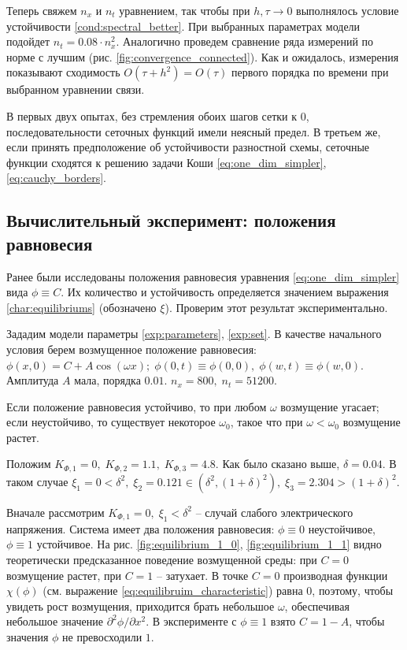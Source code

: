 Теперь свяжем $n_x$ и $n_t$ уравнением, так чтобы при $h, \tau \to 0$ выполнялось условие устойчивости \eqref{cond:spectral_better}. При выбранных параметрах модели подойдет $n_t = 0.08 \cdot n_x^2$. Аналогично проведем сравнение ряда измерений по норме с лучшим (рис. \ref{fig:convergence_connected}). Как и ожидалось, измерения показывают сходимость $O(\tau + h^2) = O(\tau)$ первого порядка по времени при выбранном уравнении связи.

В первых двух опытах, без стремления обоих шагов сетки к $0$, последовательности сеточных функций имели неясный предел. В третьем же, если принять предположение об устойчивости разностной схемы, сеточные функции сходятся к решению задачи Коши \eqref{eq:one_dim_simpler}, \eqref{eq:cauchy_borders}.


\subsection{Вычислительный эксперимент: положения равновесия}

Ранее были исследованы положения равновесия уравнения \eqref{eq:one_dim_simpler} вида $\phi \equiv C$. Их количество и устойчивость определяется значением выражения \eqref{char:equilibriums} (обозначено $\xi$). Проверим этот результат экспериментально.

Зададим модели параметры \eqref{exp:parameters}, \eqref{exp:set}. В качестве начального условия берем возмущенное положение равновесия: $\phi(x, 0) = C + A \cos(\omega x); \; \phi(0, t) \equiv \phi(0, 0), \; \phi(w, t) \equiv \phi(w, 0)$. Амплитуда $A$ мала, порядка $0.01$. $n_x = 800, \; n_t = 51200$.

Если положение равновесия устойчиво, то при любом $\omega$ возмущение угасает; если неустойчиво, то существует некоторое $\omega_0$, такое что при $\omega < \omega_0$ возмущение растет.

Положим $K_{\Phi, 1} = 0, \; K_{\Phi, 2} = 1.1, \; K_{\Phi, 3} = 4.8$. Как было сказано выше, $\delta = 0.04$. В таком случае $\xi_1 = 0 < \delta^2, \; \xi_2 = 0.121 \in (\delta^2, (1 + \delta)^2), \; \xi_3 = 2.304 > (1 + \delta)^2$.

Вначале рассмотрим $K_{\Phi, 1} = 0, \; \xi_1 < \delta^2$ -- случай слабого электрического напряжения. Система имеет два положения равновесия: $\phi \equiv 0$ неустойчивое, $\phi \equiv 1$ устойчивое. На рис. \ref{fig:equilibrium_1_0}, \ref{fig:equilibrium_1_1} видно теоретически предсказанное поведение возмущенной среды: при $C = 0$ возмущение растет, при $C = 1$ -- затухает. В точке $C = 0$ производная функции $\chi(\phi)$ (см. выражение \eqref{eq:equilibruim_characteristic}) равна $0$, поэтому, чтобы увидеть рост возмущения, приходится брать небольшое $\omega$, обеспечивая небольшое значение $\partial^2 \phi / \partial x^2$. В эксперименте с $\phi \equiv 1$ взято $C = 1 - A$, чтобы значения $\phi$ не превосходили $1$.

